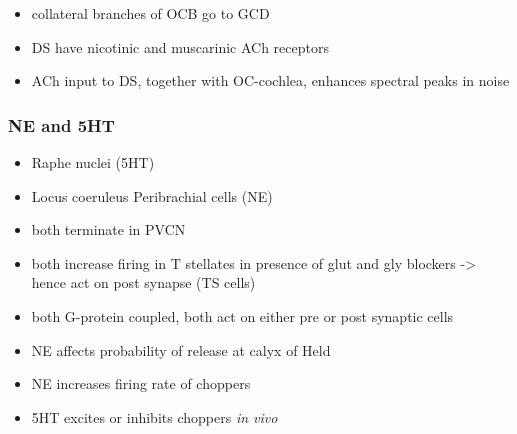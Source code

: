 \begin{itemize}
\item collateral branches of OCB go to GCD \citep{MellottMottsEtAl:2011,SherriffHenderson:1994,OsenRoth:1969}
\item DS have nicotinic and muscarinic ACh receptors \citep{FujinoOertel:2001}
\item ACh input to DS, together with OC-cochlea, enhances spectral peaks in noise  \citep{FujinoOertel:2001}
\end{itemize}

\subsubsection{NE and 5HT}

\begin{itemize}
\item Raphe nuclei (5HT)
\item Locus coeruleus Peribrachial cells (NE)
\item both terminate in PVCN \citep{KlepperHerbert:1991,Thompson:2003,ThompsonLauder:2005,Thompson:2003a,ThompsonWiechmann:2002,BehrensSchofieldEtAl:2002,ThompsonThompson:2001,ThompsonThompson:2001a,ThompsonMooreEtAl:1995,ThompsonThompsonEtAl:1994}
\item both increase firing in T stellates \citep{OertelWrightEtAl:2010} in presence of glut and gly blockers -> hence act on post synapse (TS cells)
\item both G-protein coupled, both act on either pre or post synaptic cells
\item NE affects probability of release at calyx of Held
\item NE increases firing rate of choppers \citep{KosslVater:1989,Ebert:1996}
\item 5HT excites or inhibits choppers \emph{in vivo} \citep{EbertOstwald:1992}
\end{itemize}





